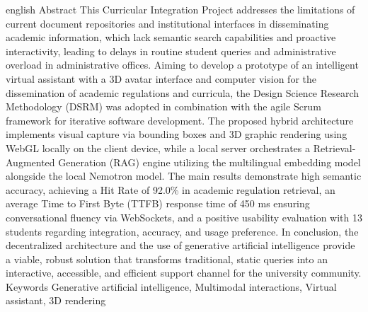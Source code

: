 \UTIResumenPagina
  {english}
  {Abstract}
  {This Curricular Integration Project addresses the limitations of current document repositories and institutional interfaces in disseminating academic information, which lack semantic search capabilities and proactive interactivity, leading to delays in routine student queries and administrative overload in administrative offices. Aiming to develop a prototype of an intelligent virtual assistant with a 3D avatar interface and computer vision for the dissemination of academic regulations and curricula, the Design Science Research Methodology (DSRM) was adopted in combination with the agile Scrum framework for iterative software development. The proposed hybrid architecture implements visual capture via bounding boxes and 3D graphic rendering using WebGL locally on the client device, while a local server orchestrates a Retrieval-Augmented Generation (RAG) engine utilizing the multilingual embedding model alongside the local Nemotron model. The main results demonstrate high semantic accuracy, achieving a Hit Rate of 92.0\% in academic regulation retrieval, an average Time to First Byte (TTFB) response time of 450 ms ensuring conversational fluency via WebSockets, and a positive usability evaluation with 13 students regarding integration, accuracy, and usage preference. In conclusion, the decentralized architecture and the use of generative artificial intelligence provide a viable, robust solution that transforms traditional, static queries into an interactive, accessible, and efficient support channel for the university community.}
  {Keywords}
  {Generative artificial intelligence, Multimodal interactions, Virtual assistant, 3D rendering}
